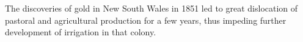The discoveries of gold in New South Wales in 1851 led to great
dislocation of pastoral and agricultural production for a few years,
thus impeding further development of irrigation in that colony.

